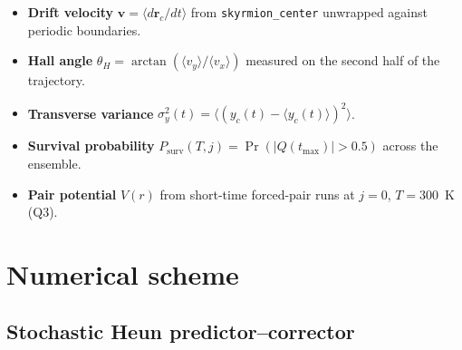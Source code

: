 \documentclass[11pt,a4paper]{article}
\newcommand{\mb}[1]{\mathbf{#1}}
\newcommand{\jcur}{j}
\begin{document}
\begin{itemize}[leftmargin=2em]
    \item \textbf{Drift velocity}
    $\mb{v} = \langle d\mb{r}_c / dt \rangle$ from
    \texttt{skyrmion\_center} unwrapped against periodic boundaries.
    \item \textbf{Hall angle}
    $\theta_H = \arctan(\langle v_y \rangle / \langle v_x \rangle)$
    measured on the second half of the trajectory.
    \item \textbf{Transverse variance}
    $\sigma_y^2(t) = \langle (y_c(t) - \langle y_c(t)\rangle)^2 \rangle$.
    \item \textbf{Survival probability}
    $P_{\text{surv}}(T, \jcur) = \Pr(|Q(t_{\max})| > 0.5)$ across the
    ensemble.
    \item \textbf{Pair potential} $V(r)$ from short-time forced-pair
    runs at $\jcur = 0$, $T = 300$~K (Q3).
\end{itemize}

\section{Numerical scheme}

\subsection{Stochastic Heun predictor--corrector}
\end{document}
